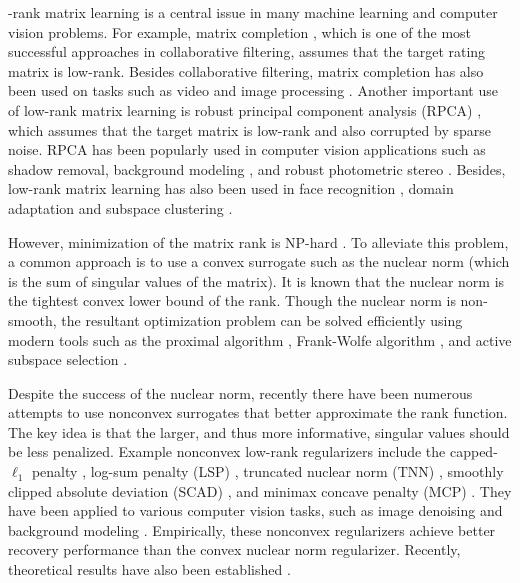 \documentclass[10pt,journal,compsoc]{IEEEtran}
\begin{document}
-rank matrix 
learning 
is a central issue in many machine learning and computer vision problems. For example, 
matrix completion
\cite{candes2009exact},
which is one of the most successful approaches in collaborative filtering,
assumes that the target rating matrix is low-rank. 
Besides 
collaborative filtering,
matrix completion has also been used on tasks such as
video and image processing \cite{hu2013fast,lu2016nonconvex,gu2016weighted}.
Another important use of low-rank matrix learning is robust principal component analysis (RPCA) \cite{candes2011robust}, 
which assumes that the target 
matrix 
is 
low-rank 
and also corrupted by  sparse noise.  RPCA has been popularly used in computer vision
applications such as shadow removal, background modeling
\cite{candes2011robust,sun2013robust,oh2016partial}, and
robust photometric stereo \cite{wu2010robust}.
Besides,
low-rank matrix learning has also been used in 
face recognition \cite{candes2011robust,sun2013robust},
domain adaptation \cite{li2017domain}
and 
subspace clustering \cite{liu2013robust,xiao2016robust,xiao2015falrr}.

However, minimization of the matrix rank 
is NP-hard \cite{candes2009exact}. To alleviate this problem, a common
approach is to use  
a convex surrogate such as 
the nuclear norm (which is the sum of singular values of the matrix).
It is known that the
nuclear norm is the tightest convex lower bound of the rank.
Though the nuclear norm is non-smooth, the resultant optimization problem can be 
solved efficiently using modern tools such as the
proximal algorithm \cite{ji2009accelerated,mazumder2010spectral,quan2015impute},
Frank-Wolfe algorithm \cite{zhang2012accelerated},
and active subspace selection \cite{hsieh2014nuclear}.

Despite the success of the nuclear norm, recently there have been numerous attempts to use
nonconvex surrogates that better
approximate the rank function.
The key idea is 
that the larger, and thus more informative, singular values
should be less penalized.
Example nonconvex low-rank regularizers include
the capped-$\ell_1$ penalty \cite{zhang2010analysis},
log-sum penalty (LSP) \cite{candes2008enhancing},
truncated nuclear norm (TNN) \cite{hu2013fast,oh2016partial},
smoothly clipped absolute deviation (SCAD) \cite{fan2001variable}, and
minimax concave penalty (MCP) \cite{zhang2010nearly}. 
They have been applied to various computer vision tasks,
such as image denoising \cite{gu2016weighted} and background modeling \cite{oh2016partial}.
Empirically, these nonconvex regularizers achieve
better recovery performance than the convex nuclear norm regularizer.
Recently, theoretical results have also been established \cite{gui2016towards}.
\end{document}
